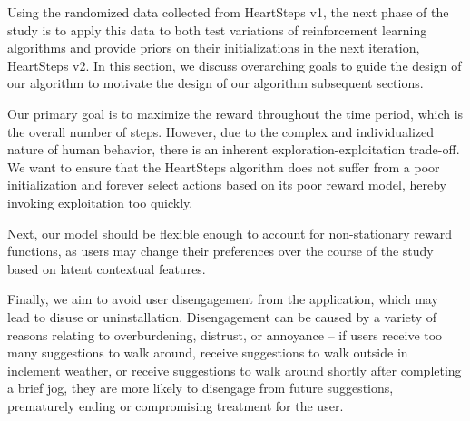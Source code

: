 	Using the randomized data collected from HeartSteps v1, the next phase of the study is to apply this data to both test variations of reinforcement learning algorithms and provide priors on their initializations in the next iteration, HeartSteps v2.  In this section, we discuss overarching goals to guide the design of our algorithm to motivate the design of our algorithm subsequent sections.

	Our primary goal is to maximize the reward throughout the time period, which is the overall number of steps.  However, due to the complex and individualized nature of human behavior, there is an inherent exploration-exploitation trade-off.  We want to ensure that the HeartSteps algorithm does not suffer from a poor initialization and forever select actions based on its poor reward model, hereby invoking exploitation too quickly.

	Next, our model should be flexible enough to account for non-stationary reward functions, as users may change their preferences over the course of the study based on latent contextual features.

	Finally, we aim to avoid user disengagement from the application, which may lead to disuse or uninstallation. Disengagement can be caused by a variety of reasons relating to overburdening, distrust, or annoyance -- if users receive too many suggestions to walk around, receive suggestions to walk outside in inclement weather, or receive suggestions to walk around shortly after completing a brief jog, they are more likely to disengage from future suggestions, prematurely ending or compromising treatment for the user.









